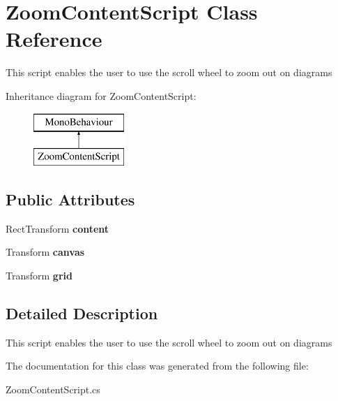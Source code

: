 \hypertarget{class_zoom_content_script}{}\section{Zoom\+Content\+Script Class Reference}
\label{class_zoom_content_script}


This script enables the user to use the scroll wheel to zoom out on diagrams  


Inheritance diagram for Zoom\+Content\+Script\+:\begin{figure}[H]
\begin{center}
\leavevmode
\includegraphics[height=2.000000cm]{class_zoom_content_script}
\end{center}
\end{figure}
\subsection*{Public Attributes}
\begin{DoxyCompactItemize}
\item 
\mbox{\label{class_zoom_content_script_a69e4b0a49e6ad07efd2d1f1880b4afca}} 
Rect\+Transform {\bfseries content}
\item 
\mbox{\label{class_zoom_content_script_a9bb6fa3258f3c8017614105a3b3a5a2d}} 
Transform {\bfseries canvas}
\item 
\mbox{\label{class_zoom_content_script_a3dff555225fc47347dd914f4d09f57ae}} 
Transform {\bfseries grid}
\end{DoxyCompactItemize}


\subsection{Detailed Description}
This script enables the user to use the scroll wheel to zoom out on diagrams 



The documentation for this class was generated from the following file\+:\begin{DoxyCompactItemize}
\item 
Zoom\+Content\+Script.\+cs\end{DoxyCompactItemize}
